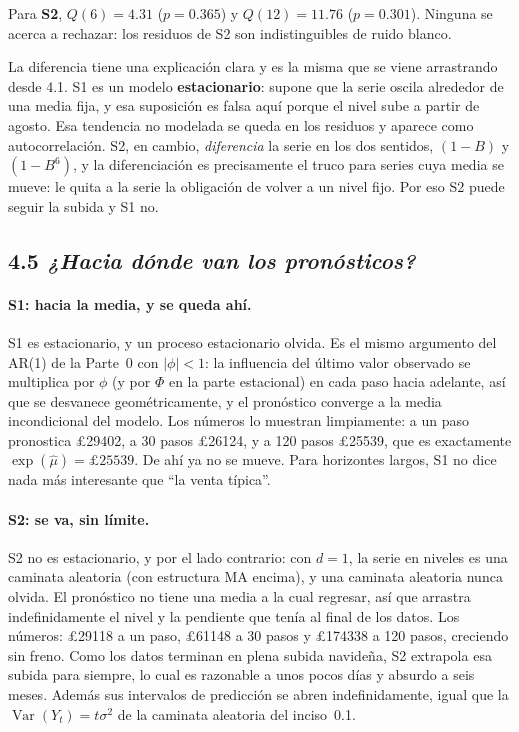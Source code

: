 \documentclass[11pt]{article}
\newcommand{\gbp}{\pounds}
\begin{document}
Para \textbf{S2}, $Q(6) = \num{4.31}$ ($p=\num{0.365}$) y
$Q(12) = \num{11.76}$ ($p=\num{0.301}$). Ninguna se acerca a rechazar: los
residuos de S2 son indistinguibles de ruido blanco.

La diferencia tiene una explicaci\'on clara y es la misma que se viene
arrastrando desde 4.1. S1 es un modelo \textbf{estacionario}: supone que la
serie oscila alrededor de una media fija, y esa suposici\'on es falsa aqu\'i
porque el nivel sube a partir de agosto. Esa tendencia no modelada se queda
en los residuos y aparece como autocorrelaci\'on. S2, en cambio,
\emph{diferencia} la serie en los dos sentidos, $(1-B)$ y $(1-B^6)$, y la
diferenciaci\'on es precisamente el truco para series cuya media se mueve: le
quita a la serie la obligaci\'on de volver a un nivel fijo. Por eso S2 puede
seguir la subida y S1 no.

\subsection{4.5 {\normalfont\itshape ¿Hacia d\'onde van los pron\'osticos?}}

\paragraph{S1: hacia la media, y se queda ah\'i.} S1 es estacionario, y un
proceso estacionario olvida. Es el mismo argumento del AR(1) de la Parte~0
con $|\phi|<1$: la influencia del \'ultimo valor observado se multiplica por
$\phi$ (y por $\Phi$ en la parte estacional) en cada paso hacia adelante,
as\'i que se desvanece geom\'etricamente, y el pron\'ostico converge a la
media incondicional del modelo. Los n\'umeros lo muestran limpiamente: a un
paso pronostica \gbp\num{29402}, a \num{30} pasos \gbp\num{26124}, y a
\num{120} pasos \gbp\num{25539}, que es exactamente
$\exp(\hat\mu) = \gbp\num{25539}$. De ah\'i ya no se mueve. Para horizontes
largos, S1 no dice nada m\'as interesante que ``la venta t\'ipica''.

\paragraph{S2: se va, sin l\'imite.} S2 no es estacionario, y por el lado
contrario: con $d=1$, la serie en niveles es una caminata aleatoria (con
estructura MA encima), y una caminata aleatoria nunca olvida. El
pron\'ostico no tiene una media a la cual regresar, as\'i que arrastra
indefinidamente el nivel y la pendiente que ten\'ia al final de los datos.
Los n\'umeros: \gbp\num{29118} a un paso, \gbp\num{61148} a \num{30} pasos y
\gbp\num{174338} a \num{120} pasos, creciendo sin freno. Como los datos
terminan en plena subida navide\~na, S2 extrapola esa subida para siempre, lo
cual es razonable a unos pocos d\'ias y absurdo a seis meses. Adem\'as sus
intervalos de predicci\'on se abren indefinidamente, igual que la
$\operatorname{Var}(Y_t) = t\sigma^2$ de la caminata aleatoria del
inciso~0.1.
\end{document}
